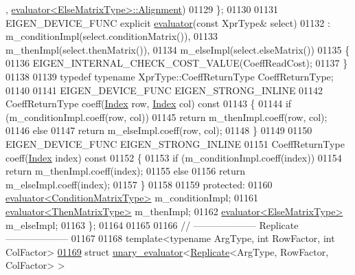 \begin{DoxyCode}
      , \hyperlink{struct_eigen_1_1internal_1_1evaluator}{evaluator<ElseMatrixType>::Alignment})
01129   \};
01130 
01131   EIGEN\_DEVICE\_FUNC \textcolor{keyword}{explicit} \hyperlink{struct_eigen_1_1internal_1_1evaluator}{evaluator}(\textcolor{keyword}{const} XprType& select)
01132     : m\_conditionImpl(select.conditionMatrix()),
01133       m\_thenImpl(select.thenMatrix()),
01134       m\_elseImpl(select.elseMatrix())
01135   \{
01136     EIGEN\_INTERNAL\_CHECK\_COST\_VALUE(CoeffReadCost);
01137   \}
01138  
01139   \textcolor{keyword}{typedef} \textcolor{keyword}{typename} XprType::CoeffReturnType CoeffReturnType;
01140 
01141   EIGEN\_DEVICE\_FUNC EIGEN\_STRONG\_INLINE
01142   CoeffReturnType coeff(\hyperlink{namespace_eigen_a62e77e0933482dafde8fe197d9a2cfde}{Index} row, \hyperlink{namespace_eigen_a62e77e0933482dafde8fe197d9a2cfde}{Index} col)\textcolor{keyword}{ const}
01143 \textcolor{keyword}{  }\{
01144     \textcolor{keywordflow}{if} (m\_conditionImpl.coeff(row, col))
01145       \textcolor{keywordflow}{return} m\_thenImpl.coeff(row, col);
01146     \textcolor{keywordflow}{else}
01147       \textcolor{keywordflow}{return} m\_elseImpl.coeff(row, col);
01148   \}
01149 
01150   EIGEN\_DEVICE\_FUNC EIGEN\_STRONG\_INLINE
01151   CoeffReturnType coeff(\hyperlink{namespace_eigen_a62e77e0933482dafde8fe197d9a2cfde}{Index} index)\textcolor{keyword}{ const}
01152 \textcolor{keyword}{  }\{
01153     \textcolor{keywordflow}{if} (m\_conditionImpl.coeff(index))
01154       \textcolor{keywordflow}{return} m\_thenImpl.coeff(index);
01155     \textcolor{keywordflow}{else}
01156       \textcolor{keywordflow}{return} m\_elseImpl.coeff(index);
01157   \}
01158  
01159 \textcolor{keyword}{protected}:
01160   \hyperlink{struct_eigen_1_1internal_1_1evaluator}{evaluator<ConditionMatrixType>} m\_conditionImpl;
01161   \hyperlink{struct_eigen_1_1internal_1_1evaluator}{evaluator<ThenMatrixType>} m\_thenImpl;
01162   \hyperlink{struct_eigen_1_1internal_1_1evaluator}{evaluator<ElseMatrixType>} m\_elseImpl;
01163 \};
01164 
01165 
01166 \textcolor{comment}{// -------------------- Replicate --------------------}
01167 
01168 \textcolor{keyword}{template}<\textcolor{keyword}{typename} ArgType, \textcolor{keywordtype}{int} RowFactor, \textcolor{keywordtype}{int} ColFactor> 
\hyperlink{struct_eigen_1_1internal_1_1unary__evaluator_3_01_replicate_3_01_arg_type_00_01_row_factor_00_01_col_factor_01_4_01_4}{01169} \textcolor{keyword}{struct }\hyperlink{struct_eigen_1_1internal_1_1unary__evaluator}{unary\_evaluator}<\hyperlink{group___core___module_class_eigen_1_1_replicate}{Replicate}<ArgType, RowFactor, ColFactor> >

\end{DoxyCode}

